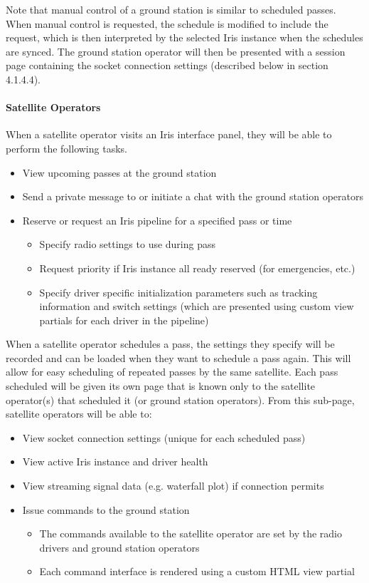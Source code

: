 \documentclass{mxl-note}
\begin{document}
Note that manual control of a ground station is similar to scheduled passes. When manual control is requested, the schedule is modified to include the request, which is then interpreted by the selected Iris instance when the schedules are synced. The ground station operator will then be presented with a session page containing the socket connection settings (described below in section 4.1.4.4).

\paragraph{Satellite Operators} When a satellite operator visits an Iris interface panel, they will be able to perform the following tasks.
\begin{itemize}
	\item View upcoming passes at the ground station
	\item Send a private message to or initiate a chat with the ground station operators
	\item Reserve or request an Iris pipeline for a specified pass or time
		\begin{itemize}
			\item Specify radio settings to use during pass
			\item Request priority if Iris instance all ready reserved (for emergencies, etc.)
			\item Specify driver specific initialization parameters such as tracking information and switch settings (which are presented using custom view partials for each driver in the pipeline)
		\end{itemize}
\end{itemize}
When a satellite operator schedules a pass, the settings they specify will be recorded and can be loaded when they want to schedule a pass again. This will allow for easy scheduling of repeated passes by the same satellite. Each pass scheduled will be given its own page that is known only to the satellite operator(s) that scheduled it (or ground station operators). From this sub-page, satellite operators will be able to:
\begin{itemize}
	\item View socket connection settings (unique for each scheduled pass)
	\item View active Iris instance and driver health
	\item View streaming signal data (e.g. waterfall plot) if connection permits
	\item Issue commands to the ground station
		\begin{itemize}
			\item The commands available to the satellite operator are set by the radio drivers and ground station operators
			\item Each command interface is rendered using a custom HTML view partial
		\end{itemize}
\end{itemize}
\end{document}
